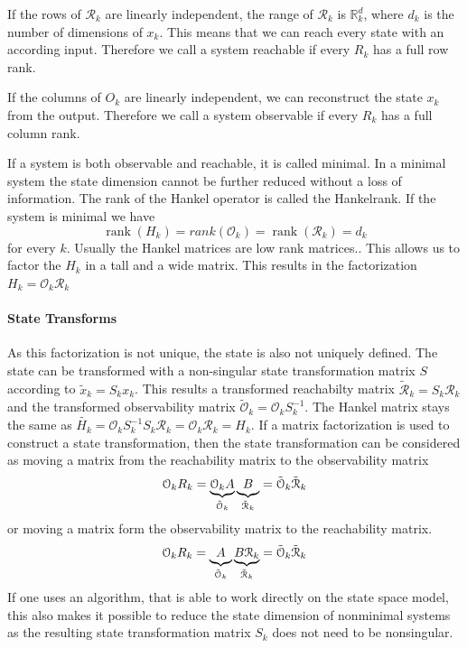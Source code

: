 \documentclass[doctype=mastersthesis,BCOR=15mm,biblatex]{ldvbook}%
\DeclareMathOperator{\rank}{rank}
\newcommand{\R}{\mathcal{R}} %
\newcommand{\Ob}{\mathcal{O}} %
\begin{document}
If the rows of $\R_k$ are linearly independent, the range of $\R_k$ is $\mathbb{R}^d_k$, where $d_k$ is the number of dimensions of $x_k$.
This means that we can reach every state with an according input.
Therefore we call a system reachable if every $R_k$ has a full row rank.

If the columns of $O_k$ are linearly independent, we can reconstruct the state $x_k$ from the output.  
Therefore we call a system observable if every $R_k$ has a full column rank.

If a system is both observable and reachable, it is called minimal.
In a minimal system the state dimension cannot be further reduced without a loss of information.
The rank of the Hankel operator is called the Hankelrank. 
If the system is minimal we have 
\begin{equation}
	\rank(H_k) = rank(\Ob_k) = \rank(\R_k) = d_k
\end{equation}
for every $k$.
Usually the Hankel matrices are low rank matrices..
This allows us to factor the $H_k$ in a tall and a wide matrix. 
This results in the factorization $H_k = \Ob_k\R_k$

\paragraph{State Transforms}
As this factorization is not unique, the state is also not uniquely defined. 
The state can be transformed with a non-singular state transformation matrix $S$ according to $\tilde{x}_k =S_kx_k$.
This results a transformed 
reachabilty matrix $\tilde{\R}_k=S_k \R_k$ and the transformed
observability matrix $\tilde{\Ob}_k= \Ob_k S_k^{-1}$. 
The Hankel matrix stays the same as $\tilde{H_k} = \Ob_k S_k^{-1} S_k \R_k= \Ob_k \R_k = H_k$.
If a matrix factorization is used to construct a state transformation, then the state transformation can be considered as moving a matrix from the reachability matrix to the observability matrix
\begin{equation}
	\Ob_{k}R_{k} = \underbrace{\Ob_{k}A}_{\tilde{\Ob}_k}\underbrace{B\vphantom{\Ob_k}}_{\tilde{\R}_k} = \tilde{\Ob}_k\tilde{\R}_k
\end{equation}
or moving a matrix form the observability matrix to the reachability matrix.
\begin{equation}
\Ob_{k}R_{k} = \underbrace{A\vphantom{\R_k}}_{\tilde{\Ob}_k}\underbrace{B\R_{k}}_{\tilde{\R}_k} = \tilde{\Ob}_k\tilde{\R}_k
\end{equation}
If one uses an algorithm, that is able to work directly on the state space model, this also makes it possible to reduce the state dimension of nonminimal systems as the resulting state transformation matrix $S_k$ does not need to be nonsingular.
\end{document}
